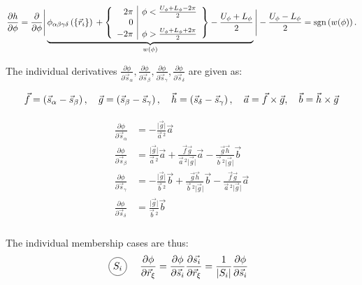 \documentclass[a4paper]{article}
\newcommand*\circled[1]{
  \tikz[baseline=(char.base)]{
    \node[shape=circle,draw,inner sep=2pt] (char) {#1};
  }
}
\begin{document}
\begin{equation}
  \frac{\partial h}{\partial \phi} = \frac{\partial}{\partial \phi}
    \Bigg\lvert
      \underbrace{\phi_{\alpha\beta\gamma\delta}\left(\left\{\vec{r}_i \right\}\right){} + \left\{
        \begin{array}{r | r}
        2\pi & \phi < \frac{U_\phi + L_\phi - 2\pi}{2}\\
        0 & \\
        -2\pi & \phi > \frac{U_\phi + L_\phi + 2\pi}{2}\\
        \end{array}
      \right\}-\frac{U_\phi+ L_\phi}{2}
      }_{w(\phi)}
    \Bigg\rvert - \frac{U_\phi - L_\phi}{2}
  = \textrm{sgn}\left(w(\phi)\right).
\end{equation}

The individual derivatives $\frac{\partial\phi}{\partial\vec{s}_{\alpha}}, 
\frac{\partial\phi}{\partial\vec{s}_{\beta}}, 
\frac{\partial\phi}{\partial\vec{s}_{\gamma}}, 
\frac{\partial\phi}{\partial\vec{s}_{\delta}}$ are given as:

\begin{equation}
  \vec{f} = \left(\vec{s}_{\alpha}-\vec{s}_{\beta}\right),
  \quad\vec{g} = \left(\vec{s}_{\beta}-\vec{s}_{\gamma}\right),
  \quad\vec{h} = \left(\vec{s}_{\delta}-\vec{s}_{\gamma}\right),
  \quad\vec{a} = \vec{f} \times \vec{g},
  \quad\vec{b} = \vec{h} \times \vec{g}
\end{equation}

\begin{align}\begin{aligned}
  \frac{\partial\phi}{\partial\vec{s}_{\alpha}} &= 
    -\frac{\lvert\vec{g}\rvert}{\vec{a}\,^2}\vec{a}\\
  \frac{\partial\phi}{\partial\vec{s}_{\beta}}  &= 
    \frac{\lvert\vec{g}\rvert}{\vec{a}\,^2}\vec{a}
    + \frac{\vec{f}\vec{g}}{\vec{a}\,^2\lvert\vec{g}\rvert}\vec{a}
    - \frac{\vec{g}\vec{h}}{\vec{b}\,^2\lvert\vec{g}\rvert}\vec{b}\\
  \frac{\partial\phi}{\partial\vec{s}_{\gamma}} &= 
    - \frac{\lvert\vec{g}\rvert}{\vec{b}\,^2}\vec{b}
    + \frac{\vec{g}\vec{h}}{\vec{b}\,^2\lvert\vec{g}\rvert}\vec{b}
    - \frac{\vec{f}\vec{g}}{\vec{a}\,^2\lvert\vec{g}\rvert}\vec{a}\\
  \frac{\partial\phi}{\partial\vec{s}_{\delta}} &= 
    \frac{\lvert\vec{g}\rvert}{\vec{b}\,^2}\vec{b}\\
\end{aligned}\end{align}

The individual membership cases are thus:
\begin{align}
  \text{\circled{$S_i$}} &\quad\frac{\partial\phi}{\partial\vec{r}_{\xi}} 
    = \frac{\partial\phi}{\partial\vec{s}_{i}}
      \frac{\partial\vec{s_{i}}}{\partial\vec{r}_{\xi}}
    = \frac{1}{\lvert S_i\rvert}
      \frac{\partial\phi}{\partial\vec{s}_{i}}
\end{align}
\end{document}
